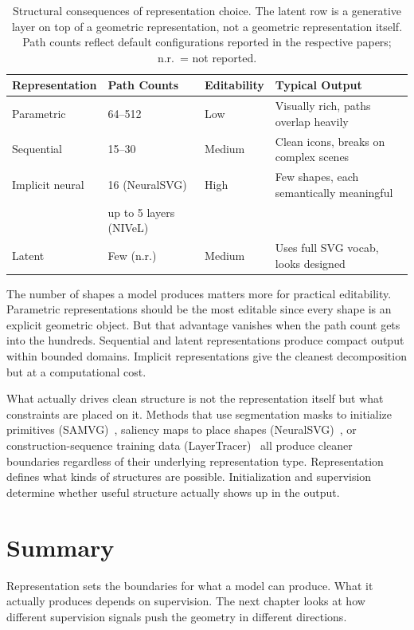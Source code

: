 \begin{table}[htbp]
\centering
\caption{Structural consequences of representation choice. The latent row is a generative layer on top of a geometric representation, not a geometric representation itself. Path counts reflect default configurations reported in the respective papers; n.r.\ = not reported.}
\label{tab:rep_structure}
\begin{tabular}{l l l p{4.6cm}}
\hline
\textbf{Representation} & \textbf{Path Counts} & \textbf{Editability} & \textbf{Typical Output} \\
\hline
Parametric      & 64--512   & Low    & Visually rich, paths overlap heavily \\
Sequential      & 15--30    & Medium & Clean icons, breaks on complex scenes \\
Implicit neural & 16 (NeuralSVG) & High   & Few shapes, each semantically meaningful \\
                & up to 5 layers (NIVeL) & & \\
Latent          & Few (n.r.) & Medium & Uses full SVG vocab, looks designed \\
\hline
\end{tabular}
\end{table}

The number of shapes a model produces matters more for practical editability. 
Parametric representations should be the most editable since every shape is an explicit geometric object. 
But that advantage vanishes when the path count gets into the hundreds. 
Sequential and latent representations produce compact output within bounded domains. 
Implicit representations give the cleanest decomposition but at a computational cost.

What actually drives clean structure is not the representation itself but what constraints are placed on it. 
Methods that use segmentation masks to initialize primitives (SAMVG)~\cite{zhuSAMVGMultistageImage2023}, 
saliency maps to place shapes (NeuralSVG)~\cite{polaczekNeuralSVGImplicitRepresentation2025}, or 
construction-sequence training data (LayerTracer)~\cite{songLayerTracerCognitiveAlignedLayered2025} 
all produce cleaner boundaries regardless of their underlying representation type. 
Representation defines what kinds of structures are possible. 
Initialization and supervision determine whether useful structure actually shows up in the output.

\section{Summary}
\label{sec:rep_summary}

Representation sets the boundaries for what a model can produce. 
What it actually produces depends on supervision. 
The next chapter looks at how different supervision
signals push the geometry in different directions.
